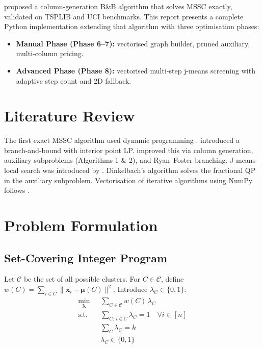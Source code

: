 \documentclass[12pt,a4paper]{article}
\begin{document}
\citet{aloise2012} proposed a column-generation B\&B algorithm that solves MSSC exactly, validated on TSPLIB and UCI benchmarks. This report presents a complete Python implementation extending that algorithm with three optimisation phases:
\begin{itemize}[noitemsep]
  \item \textbf{Manual Phase (Phase 6--7):} vectorised graph builder, pruned auxiliary, multi-column pricing.
  \item \textbf{Advanced Phase (Phase 8):} vectorised multi-step j-means screening with adaptive step count and 2D fallback.
\end{itemize}

\section{Literature Review}

The first exact MSSC algorithm used dynamic programming \citep{selim1984}. \citet{du2000} introduced a branch-and-bound with interior point LP. \citet{aloise2012} improved this via column generation, auxiliary subproblems (Algorithms 1 \& 2), and Ryan--Foster branching. J-means local search was introduced by \citet{hansen2001}. Dinkelbach's algorithm \citep{dinkelbach1967} solves the fractional QP in the auxiliary subproblem. Vectorisation of iterative algorithms using NumPy follows \citet{sculley2010}.

\section{Problem Formulation}
\label{sec:formulation}

\subsection{Set-Covering Integer Program}

Let $\mathcal{C}$ be the set of all possible clusters. For $C \in \mathcal{C}$, define $w(C) = \sum_{i\in C}\|\mathbf{x}_i - \boldsymbol{\mu}(C)\|^2$. Introduce $\lambda_C \in \{0,1\}$:
\begin{align}
  \min_{\boldsymbol{\lambda}} &\sum_{C \in \mathcal{C}} w(C)\,\lambda_C \label{eq:ip} \\
  \text{s.t.}\quad &\sum_{C:\,i\in C} \lambda_C = 1 \quad \forall i \in [n] \tag{coverage} \\
                   &\sum_C \lambda_C = k \tag{cardinality} \\
                   &\lambda_C \in \{0,1\} \tag{integrality}
\end{align}
\end{document}
